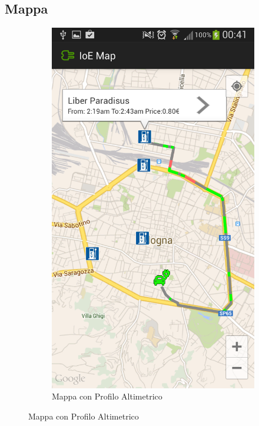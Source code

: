 \subsection{Mappa}\label{subsec:map}


\begin{figure}
	\centering
	\begin{subfigure}{0.45\textwidth}
		\includegraphics[width=\textwidth]{assets/mobile-app-map.png}
		\caption{Mappa con Profilo Altimetrico}
		\label{fig:map-altimetry}

\end{subfigure}
\end{figure}
